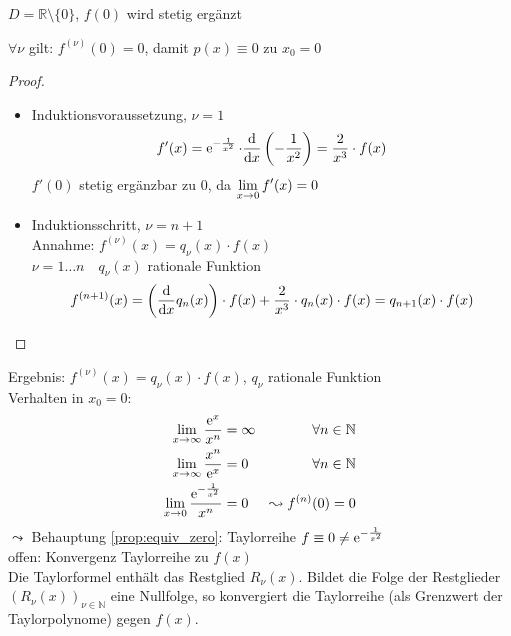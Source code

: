 \noindent $D=\mathbb{R}\setminus \{0\}$, $f(0)$ wird stetig ergänzt
\begin{proposition}\label{prop:equiv_zero}
  $\forall \nu$ gilt: $f^{(\nu)}(0) = 0$, damit $p(x) \equiv 0 \text{ zu } x_0 = 0$
\end{proposition}

\begin{center}
\end{center}

\begin{proof}
  \begin{itemize}
    \item Induktionsvoraussetzung, $\nu = 1$
      \[ f'(x) = \operatorname{e}^{-\frac{1}{x^2}}\cdot \frac{\mathrm d}{\mathrm d x}\left(-\frac{1}{x^2}\right) = \frac{2}{x^3}\cdot f(x) \]
      $f'(0)$ stetig ergänzbar zu $0$, da $\displaystyle\lim_{x \rightarrow 0} f'(x) = 0$
    \item Induktionsschritt, $\nu = n + 1$\\
      Annahme: $f^{(\nu)}(x) = q_\nu(x)\cdot f(x)$\\
      $\nu=1\ldots n \quad q_\nu(x)$ rationale Funktion
      \[
        f^{(n+1)}(x) = \left(\frac{\mathrm d}{\mathrm d x} q_n(x)\right)\cdot f(x) + \frac{2}{x^3} \cdot q_n(x) \cdot f(x)= q_{n+1}(x) \cdot f(x)
      \]
  \end{itemize}
\end{proof}
\noindent Ergebnis: $f^{(\nu)}(x) = q_\nu(x)\cdot f(x)$, $q_\nu$ rationale Funktion\\
Verhalten in $x_0 = 0$:
\begin{align*}
   \lim_{x\rightarrow \infty} \frac{\operatorname{e}^x}{x^n} & = \infty & \forall n \in \mathbb{N}\\
   \lim_{x\rightarrow \infty} \frac{x^n}{\operatorname{e}^x} & = 0 & \forall n \in \mathbb{N}\\
   \lim_{x\rightarrow 0} \frac{\operatorname{e}^{-\frac{1}{x^2}}}{x^n} & = 0 & \leadsto f^{(n)}(0) = 0
\end{align*}
$\leadsto$ Behauptung \ref{prop:equiv_zero}: Taylorreihe $f \equiv 0 \neq \operatorname{e}^{-\frac{1}{x^2}}$\\
offen: Konvergenz Taylorreihe zu $f(x)$\\
Die Taylorformel enthält das Restglied $R_\nu(x)$. Bildet die Folge der Restglieder $(R_\nu(x))_{\nu \in \mathbb{N}}$ eine Nullfolge, so konvergiert die Taylorreihe (als Grenzwert der Taylorpolynome) gegen $f(x)$.

